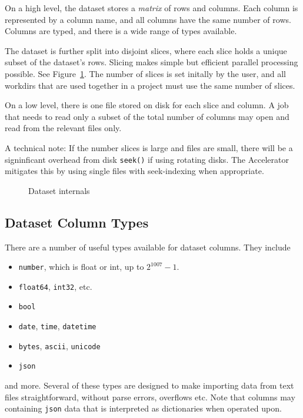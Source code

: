 \documentclass[a4paper]{article}
\begin{document}
On a high level, the dataset stores a \textsl{matrix} of rows and
columns.  Each column is represented by a column name, and all columns
have the same number of rows.  Columns are typed, and there is a wide
range of types available.

The dataset is further split into disjoint slices, where each slice
holds a unique subset of the dataset's rows.  Slicing makes simple but
efficient parallel processing possible.  See Figure~\ref{fig:slices}.
The number of slices is set initally by the user, and all workdirs
that are used together in a project must use the same number of
slices.

On a low level, there is one file stored on disk for each slice and
column.  A job that needs to read only a subset of the total number of
columns may open and read from the relevant files only.

A technical note: If the number slices is large and files are small,
there will be a signinficant overhead from disk \texttt{seek()} if
using rotating disks.  The Accelerator mitigates this by using single
files with seek-indexing when appropriate.


\begin{figure}[h!]
  \begin{center}
    
    \caption{Dataset internals}
    \label{fig:slices}
  \end{center}
\end{figure}

\clearpage




\subsection{Dataset Column Types}
There are a number of useful types available for dataset columns.  They include
\begin{itemize}
  \item[] \texttt{number}, which is float or int, up to $2^{1007}-1$.
  \item[] \texttt{float64}, \texttt{int32}, etc.
  \item[] \texttt{bool}
  \item[] \texttt{date}, \texttt{time}, \texttt{datetime}
  \item[] \texttt{bytes}, \texttt{ascii}, \texttt{unicode}
  \item[] \texttt{json}
\end{itemize}
and more.  Several of these types are designed to make importing data
from text files straightforward, without parse errors, overflows etc.
Note that columns may containing \texttt{json} data that is
interpreted as dictionaries when operated upon.
\end{document}
